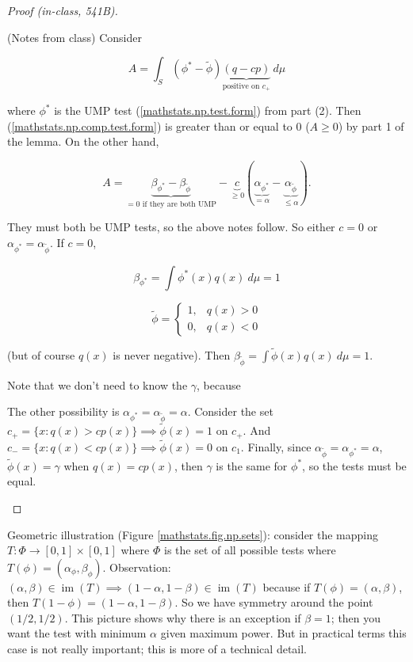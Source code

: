 \begin{proof}[Proof (in-class, 541B)]
\begin{enumerate}
(Notes from class) Consider 

\begin{equation}\label{mathstats.np.comp.test.form}
A = \int_S (\phi^* - \tilde{\phi}) \underbrace{(q - cp)}_{\text{positive on } c_+} \ d\mu
\end{equation}

where \(\phi^*\) is the UMP test (\ref{mathstats.np.test.form}) from part (2). Then (\ref{mathstats.np.comp.test.form}) is greater than or equal to 0 (\(A \geq 0\)) by part 1 of the lemma. On the other hand,

\[
A = \underbrace{\beta_{\phi^*} - \beta_{\tilde{\phi}}}_{=0 \text{ if they are both UMP}} - \underbrace{c}_{\geq 0} \left( \underbrace{\alpha_{\phi^*}}_{= \alpha} - \underbrace{\alpha_{\tilde{\phi}}}_{\leq \alpha} \right).
\]

They must both be UMP tests, so the above notes follow. So either \(c = 0\) or \(\alpha_{\phi^*} = \alpha_{\tilde{\phi}}\). If \(c = 0\), 

\[
\beta_{\phi^*}  = \int \phi^*(x) q(x) \ d \mu = 1
\]


\[
\tilde{\phi} = \begin{cases}
1, & q(x) > 0 \\
0, & q(x) < 0
\end{cases}
\]

(but of course \(q(x)\) is never negative). Then \(\beta_{\tilde{\phi}} = \int \tilde{\phi}(x) q(x) \ d\mu = 1\).

Note that we don't need to know the \(\gamma\), because 

The other possibility is \(\alpha_{\phi^*} = \alpha_{\tilde{\phi}} = \alpha \). Consider the set \(c_+ = \{x : q(x) > c p(x)\} \implies \tilde{\phi}(x) = 1\) on \(c_+\). And \(c_- = \{x: q(x) < c p(x) \} \implies \tilde{\phi}(x) = 0 \) on \(c_1\). Finally, since \( \alpha_{\tilde{\phi}} = \alpha_{\phi^*} = \alpha\), \(\tilde{\phi}(x) = \gamma\) when \(q(x) = c p(x)\), then \(\gamma\) is the same for \(\phi^*\), so the tests must be equal.

\end{enumerate}

\end{proof}

Geometric illustration (Figure \ref{mathstats.fig.np.sets}): consider the mapping \(T: \Phi \to [0,1] \times [0,1]\) where \(\Phi\) is the set of all possible tests where \(T(\phi) = (\alpha_\phi, \beta_\phi)\). Observation: \((\alpha, \beta) \in \operatorname{im}(T) \implies (1 - \alpha, 1 - \beta) \in \operatorname{im}(T)\) because if \(T(\phi) = (\alpha, \beta)\), then \( T(1 - \phi) = (1 - \alpha, 1 - \beta)\). So we have symmetry around the point \((1/2, 1/2)\). This picture shows why there is an exception if \(\beta = 1\); then you want the test with minimum \(\alpha\) given maximum power. But in practical terms this case is not really important; this is more of a technical detail.

